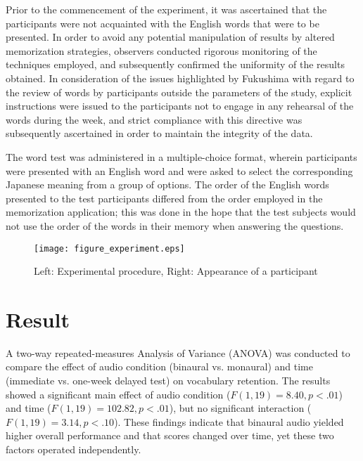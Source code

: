 \documentclass{ehissymp}
\begin{document}
Prior to the commencement of the experiment, it was ascertained that the participants were not acquainted with the English words that were to be presented. In order to avoid any potential manipulation of results by altered memorization strategies, observers conducted rigorous monitoring of the techniques employed, and subsequently confirmed the uniformity of the results obtained. In consideration of the issues highlighted by Fukushima\cite{Fukushima2019} with regard to the review of words by participants outside the parameters of the study, explicit instructions were issued to the participants not to engage in any rehearsal of the words during the week, and strict compliance with this directive was subsequently ascertained in order to maintain the integrity of the data.

The word test was administered in a multiple-choice format, wherein participants were presented with an English word and were asked to select the corresponding Japanese meaning from a group of options. The order of the English words presented to the test participants differed from the order employed in the memorization application; this was done in the hope that the test subjects would not use the order of the words in their memory when answering the questions.

\begin{figure}[H]
  \centering
  \texttt{[image: figure\_experiment.eps]}
  \caption{Left: Experimental procedure, Right: Appearance of a participant}
  \label{fig:exp_procedure} 
\end{figure}

\section{Result}
A two-way repeated-measures Analysis of Variance (ANOVA) was conducted to compare the effect of audio condition (binaural vs. monaural) and time (immediate vs. one-week delayed test) on vocabulary retention. The results showed a significant main effect of audio condition ($F(1, 19) = 8.40, p < .01$) and time ($F(1, 19) = 102.82, p < .01$), but no significant interaction ($F(1, 19) = 3.14, p < .10$). These findings indicate that binaural audio yielded higher overall performance and that scores changed over time, yet these two factors operated independently.
\end{document}

